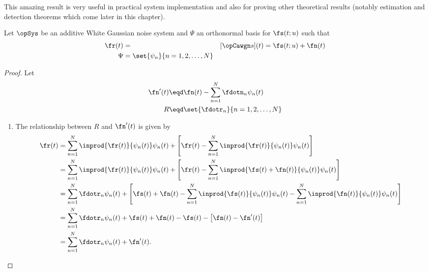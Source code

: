 {This amazing result is very useful in practical system implementation
and also for proving other theoretical results
(notably estimation and detection theorems which come later
in this chapter).


\begin{theorem}
\label{thm:sstat}
 
  
Let $\opSys$ be an additive White Gaussian noise system and
$\Psi$ an orthonormal basis for $\fs(t;u)$ such that
\begin{align*}
   \fr(t)      &=   & [\opCawgn s](t) = \fs(t;u) + \fn(t)      \\
   \Psi      &= \set{\psi_n}{n=1,2,\ldots, N}
\end{align*}
\end{theorem}
\begin{proof}
Let
\begin{align*}
  \fn'(t) &\eqd \fn(t) - \sum_{n=1}^N \fdotn_n \psi_n(t) \\
  R       &\eqd \set{\fdotr_n}{n=1,2,\ldots,N}
\end{align*}

\begin{enumerate}
\item The relationship between $R$ and $\fn'(t)$ is given by
\begin{align*}
   \fr(t)
     &= \sum_{n=1}^N \inprod{\fr(t)}{\psi_n(t)}\psi_n(t) +
        \left[\fr(t)- \sum_{n=1}^N \inprod{\fr(t)}{\psi_n(t)}\psi_n(t) \right]
   \\&= \sum_{n=1}^N \inprod{\fr(t)}{\psi_n(t)}\psi_n(t) +
        \left[\fr(t)- \sum_{n=1}^N \inprod{\fs(t)+\fn(t)}{\psi_n(t)}\psi_n(t) \right]
   \\&= \sum_{n=1}^N \fdotr_n\psi_n(t) +
        \left[\fs(t)+\fn(t) - \sum_{n=1}^N \inprod{\fs(t)}{\psi_n(t)}\psi_n(t)
                        - \sum_{n=1}^N \inprod{\fn(t)}{\psi_n(t)}\psi_n(t) \right]
   \\&= \sum_{n=1}^N \fdotr_n\psi_n(t) +
        \fs(t)+\fn(t) - \fs(t) - \left[ \fn(t) - \fn'(t)\right]
   \\&= \sum_{n=1}^N \fdotr_n\psi_n(t) + \fn'(t).
\end{align*}


\end{enumerate}
\end{proof}}
